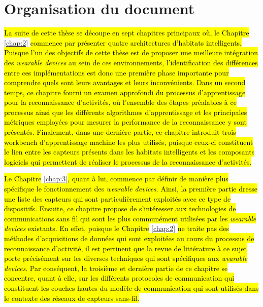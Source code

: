 {{\section{Organisation du document}

\hl{La suite de cette thèse se découpe en sept chapitres principaux où, le Chapitre} \ref{chap:2} \hl{commence par présenter quatre architectures d'habitats intelligents. Puisque l'un des objectifs de cette thèse est de proposer une meilleure intégration des \textit{wearable devices} au sein de ces environnements, l'identification des différences entre ces implémentations est donc une première phase importante pour comprendre quels sont leurs avantages et leurs inconvénients. Dans un second temps, ce chapitre fourni un examen approfondi du processus d'apprentissage pour la reconnaissance d'activités, où l'ensemble des étapes préalables à ce processus ainsi que les différents algorithmes d'apprentissage et les principales métriques employées pour mesurer la performance de la reconnaissance y sont présentés. Finalement, dans une dernière partie, ce chapitre introduit trois workbench d'apprentissage machine les plus utilisés, puisque ceux-ci constituent le lien entre les capteurs présents dans les habitats intelligents et les composants logiciels qui permettent de réaliser le processus de la reconnaissance d'activités.}

\hl{Le Chapitre} \ref{chap:3}\hl{, quant à lui, commence par définir de manière plus spécifique le fonctionnement des \textit{wearable devices}. Ainsi, la première partie dresse une liste des capteurs qui sont particulièrement exploités avec ce type de dispositifs. Ensuite, ce chapitre propose de s'intéresser aux technologies de communications sans fil qui sont les plus communément utilisées par les \textit{wearable devices} existants. En effet, puisque le Chapitre} \ref{chap:2} \hl{ne traite pas des méthodes d'acquisitions de données qui sont exploitées au cours du processus de reconnaissance d'activité, il est pertinent que la revue de littérature à ce sujet porte précisément sur les diverses techniques qui sont spécifiques aux \textit{wearable devices}. Par conséquent, la troisième et dernière partie de ce chapitre se concentre, quant à elle, sur les différents protocoles de communication qui constituent les couches hautes du modèle de communication qui sont utilisés dans le contexte des réseaux de capteurs sans-fil.}

}}
